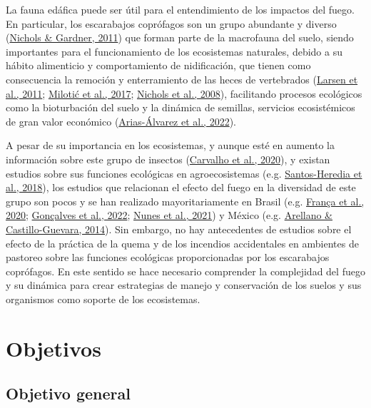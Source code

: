 \documentclass[
  11pt,
  a4paper]{book}
\begin{document}
La fauna edáfica puede ser útil para el entendimiento de los impactos del fuego. En particular, los escarabajos coprófagos son un grupo abundante y diverso (\protect\hyperlink{ref-nichols2011dung}{Nichols \& Gardner, 2011}) que forman parte de la macrofauna del suelo, siendo importantes para el funcionamiento de los ecosistemas naturales, debido a su hábito alimenticio y comportamiento de nidificación, que tienen como consecuencia la remoción y enterramiento de las heces de vertebrados (\protect\hyperlink{ref-larsen2011insects}{Larsen et al., 2011}; \protect\hyperlink{ref-milotic2017linking}{Milotić et al., 2017}; \protect\hyperlink{ref-nichols2008ecological}{Nichols et al., 2008}), facilitando procesos ecológicos como la bioturbación del suelo y la dinámica de semillas, servicios ecosistémicos de gran valor económico (\protect\hyperlink{ref-arias2022efecto}{Arias-Álvarez et al., 2022}).

A pesar de su importancia en los ecosistemas, y aunque esté en aumento la información sobre este grupo de insectos (\protect\hyperlink{ref-carvalho2020dung}{Carvalho et al., 2020}), y existan estudios sobre sus funciones ecológicas en agroecosistemas (e.g. \protect\hyperlink{ref-santos2018dung}{Santos-Heredia et al., 2018}), los estudios que relacionan el efecto del fuego en la diversidad de este grupo son pocos y se han realizado mayoritariamente en Brasil (e.g. \protect\hyperlink{ref-francca2020nino}{França et al., 2020}; \protect\hyperlink{ref-gonccalves2022quantifying}{Gonçalves et al., 2022}; \protect\hyperlink{ref-nunes2021functional}{Nunes et al., 2021}) y México (e.g. \protect\hyperlink{ref-arellano2014efecto}{Arellano \& Castillo-Guevara, 2014}). Sin embargo, no hay antecedentes de estudios sobre el efecto de la práctica de la quema y de los incendios accidentales en ambientes de pastoreo sobre las funciones ecológicas proporcionadas por los escarabajos coprófagos. En este sentido se hace necesario comprender la complejidad del fuego y su dinámica para crear estrategias de manejo y conservación de los suelos y sus organismos como soporte de los ecosistemas.

\hypertarget{objetivos}{%
\chapter{Objetivos}\label{objetivos}}

\hypertarget{objetivo-general}{%
\section{Objetivo general}\label{objetivo-general}}
\end{document}
